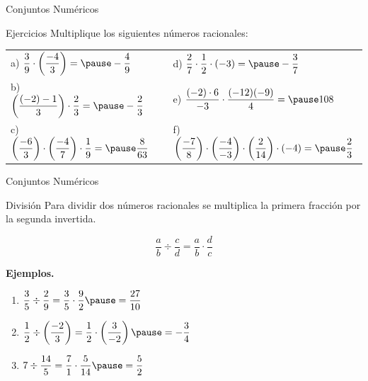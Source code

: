 \documentclass[handout,10pt]{beamer}
\begin{document}
	\begin{frame}{Conjuntos Numéricos}
		\begin{block}{Ejercicios}
			Multiplique los siguientes números racionales:
			
			\bigskip
			\begin{tabular}{lll}
				a) $\dfrac{3}{9}\cdot\left(\dfrac{-4}{3}\right)=\pause -\dfrac{4}{9}$ &
				&
				d) $\dfrac{2}{7}\cdot\dfrac{1}{2}\cdot(-3)=\pause -\dfrac{3}{7}$ \\[0.25cm]
				
				b) $\left(\dfrac{(-2)-1}{3}\right)\cdot\dfrac{2}{3}=\pause -\dfrac{2}{3}$ &
				&
				e) $\dfrac{(-2)\cdot6}{-3}\cdot\dfrac{(-12)(-9)}{4}=\pause 108$ \\[0.25cm]
				
				c) $\left(\dfrac{-6}{3}\right)\cdot\left(\dfrac{-4}{7}\right)\cdot\dfrac{1}{9}
				=\pause \dfrac{8}{63}$ &
				&
				f) $\left(\dfrac{-7}{8}\right)\cdot\left(\dfrac{-4}{-3}\right)\cdot\left(\dfrac{2}{14}\right)\cdot(-4)
				=\pause \dfrac{2}{3}$
			\end{tabular}
		\end{block}
	\end{frame}
	
	\begin{frame}{Conjuntos Numéricos}
		\begin{block}{División}
			Para dividir dos números racionales se multiplica la primera fracción por la segunda invertida.
			
			\[
			\frac{a}{b}\div\frac{c}{d}=\frac{a}{b}\cdot\frac{d}{c}
			\]
			
			\textbf{Ejemplos.}
			\begin{enumerate}
				\item $\dfrac{3}{5}\div\dfrac{2}{9}
				=
				\dfrac{3}{5}\cdot\dfrac{9}{2}
				\pause
				=
				\dfrac{27}{10}$
				\pause
				
				\item $\dfrac{1}{2}\div\left(\dfrac{-2}{3}\right)
				=
				\dfrac{1}{2}\cdot\left(\dfrac{3}{-2}\right)
				\pause
				=
				-\dfrac{3}{4}$
				\pause
				
				\item $7\div\dfrac{14}{5}
				=
				\dfrac{7}{1}\cdot\dfrac{5}{14}
				\pause
				=
				\dfrac{5}{2}$
			\end{enumerate}
		\end{block}
	\end{frame}
	
\end{document}
